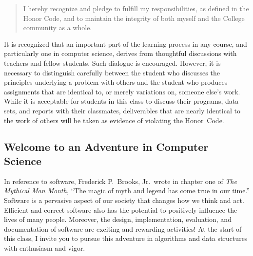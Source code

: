 \vspace*{-.1in}
\begin{quote}
  I hereby recognize and pledge to fulfill my responsibilities, as defined in the Honor Code, and to maintain the
  integrity of both myself and the College community as a whole.
\end{quote}
\vspace*{-.15in}

\noindent It is recognized that an important part of the learning process in any course, and particularly one in
computer science, derives from thoughtful discussions with teachers and fellow students.  Such dialogue is encouraged.
However, it is necessary to distinguish carefully between the student who discusses the principles underlying a problem
with others and the student who produces assignments that are identical to, or merely variations on, someone else's
work.  While it is acceptable for students in this class to discuss their programs, data sets, and reports with their
classmates, deliverables that are nearly identical to the work of others will be taken as evidence of violating the
\mbox{Honor Code}.

\subsection*{Welcome to an Adventure in Computer Science}

In reference to software, Frederick P.\ Brooks, Jr.\ wrote in chapter one of {\em The Mythical Man Month}, ``The magic
of myth and legend has come true in our time.'' Software is a pervasive aspect of our society that changes how we think
and act.  Efficient and correct software also has the potential to positively influence the lives of many people.
Moreover, the design, implementation, evaluation, and documentation of software are exciting and rewarding activities!
At the start of this class, I invite you to pursue this adventure in algorithms and data structures with enthusiasm and
vigor.


